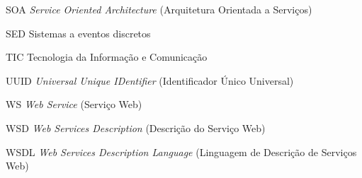 \begin{siglas}
	\item[SOA] \textit{Service Oriented Architecture} (Arquitetura Orientada a Serviços)
	\item[SED] Sistemas a eventos discretos
	\item[TIC] Tecnologia da Informação e Comunicação
	\item[UUID] \textit{Universal Unique IDentifier} (Identificador Único Universal)
	\item[WS] \textit{Web Service} (Serviço Web)
	\item[WSD] \textit{Web Services Description} (Descrição do Serviço Web)
	\item[WSDL] \textit{Web Services Description Language} (Linguagem de Descrição de Serviços Web)
\end{siglas}

\tableofcontents*
\cleardoublepage
